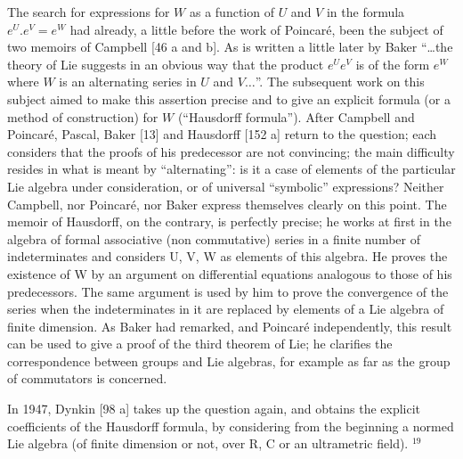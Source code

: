 The search for expressions for \(W\) as a function of \(U\) and \(V\) in the formula \(e^U.e^V = e^W\) had already, a little before the work of Poincaré, been the subject of two memoirs of Campbell {[}46 a and b{]}. As is written a little later by Baker ``\ldots the theory of Lie suggests in an obvious way that the product \(e^Ue^V\) is of the form \(e^W\) where \(W\) is an alternating series in \(U\) and \(V\ldots\)''. The subsequent work on this subject aimed to make this assertion precise and to give an explicit formula (or a method of construction) for \(W\) (``Hausdorff formula''). After Campbell and Poincaré, Pascal, Baker {[}13{]} and Hausdorff {[}152 a{]} return to the question; each considers that the proofs of his predecessor are not convincing; the main difficulty resides in what is meant by ``alternating'': is it a case of elements of the particular Lie algebra under consideration, or of universal ``symbolic'' expressions? Neither Campbell, nor Poincaré, nor Baker express themselves clearly on this point. The memoir of Hausdorff, on the contrary, is perfectly precise; he works at first in the algebra of formal associative (non commutative) series in a finite number of indeterminates and considers U, V, W as elements of this algebra. He proves the existence of W by an argument on differential equations analogous to those of his predecessors. The same argument is used by him to prove the convergence of the series when the indeterminates in it are replaced by elements of a Lie algebra of finite dimension. As Baker had remarked, and Poincaré independently, this result can be used to give a proof of the third theorem of Lie; he clarifies the correspondence between groups and Lie algebras, for example as far as the group of commutators is concerned.

In 1947, Dynkin {[}98 a{]} takes up the question again, and obtains the explicit coefficients of the Hausdorff formula, by considering from the beginning a normed Lie algebra (of finite dimension or not, over R, C or an ultrametric field). \(^{19}\)

